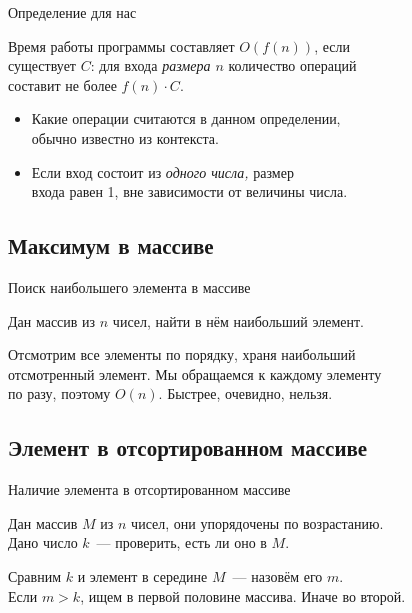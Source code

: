 \begin{frame}{Определение для нас} \ \\
\begin{defn}
	Время работы программы составляет \(O(f(n))\), если \\
	существует \(C\): для входа {\it размера \(n\)} количество операций \\
	составит не более \(f(n) \cdot C\).
\end{defn}

\begin{itemize}
	\item Какие операции считаются в данном определении, \\
	      обычно известно из контекста.
	\item Если вход состоит из {\it одного числа,} размер \\
	      входа равен 1, вне зависимости от величины числа.
\end{itemize}
\end{frame}

\subsection{Максимум в массиве}

\begin{frame}{Поиск наибольшего элемента в массиве} \ \\
\begin{task}
	Дан массив из \(n\) чисел, найти в нём наибольший элемент.
\end{task}

Отсмотрим все элементы по порядку, храня наибольший \\
отсмотренный элемент. Мы обращаемся к каждому элементу \\
по разу, поэтому \(O(n)\). Быстрее, очевидно, нельзя.
	
\end{frame}

\subsection{Элемент в отсортированном массиве}

\begin{frame}{Наличие элемента в отсортированном массиве} \ \\
\begin{task}
	Дан массив \(M\) из \(n\) чисел, они упорядочены по возрастанию. \\
	Дано число \(k\)~— проверить, есть ли оно в \(M\).
\end{task}

Сравним \(k\) и элемент в середине \(M\)~— назовём его \(m\). \\
Если \(m>k\), ищем в первой половине массива. Иначе во второй.
	
\end{frame}

